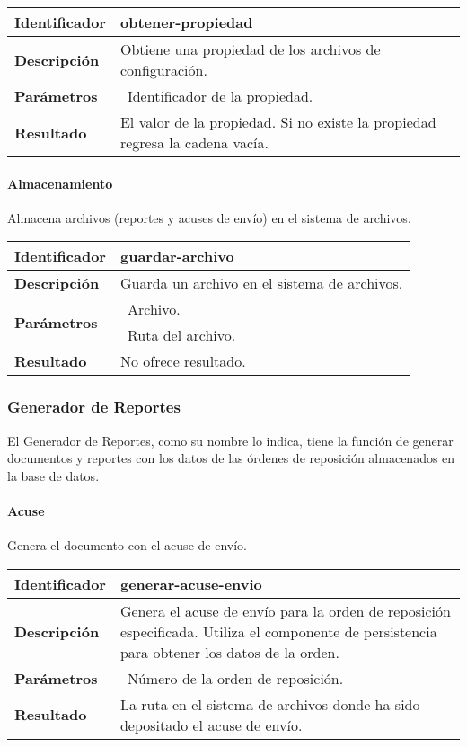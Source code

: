 	\begin{longtable}{|p{}|p{}|}
		\hline
		\textbf{Identificador}	& \textbf{obtener-propiedad}\\
		\hline
		\hline
		\textbf{Descripción}	& Obtiene una propiedad de los archivos de configuración.\\
		\hline
		\textbf{Parámetros}		& \textbullet\, Identificador de la propiedad.\\
		\hline
		\textbf{Resultado}		& El valor de la propiedad. Si no existe la propiedad regresa la cadena vacía.\\
		\hline
	\end{longtable}

\paragraph{Almacenamiento\\}
Almacena archivos (reportes y acuses de envío) en el sistema de archivos.

	\begin{longtable}{|p{}|p{}|}
		\hline
		\textbf{Identificador}	& \textbf{guardar-archivo}\\
		\hline
		\hline
		\textbf{Descripción}	& Guarda un archivo en el sistema de archivos.\\
		\hline
		\multirow{2}{*}{\textbf{Parámetros}}	& \textbullet\, Archivo.\\
												& \textbullet\, Ruta del archivo.\\
		\hline
		\textbf{Resultado}		& No ofrece resultado.\\
		\hline
	\end{longtable}

\subsubsection{Generador de Reportes}
El Generador de Reportes, como su nombre lo indica, tiene la función de generar documentos y reportes con los datos de las órdenes de reposición almacenados en la base de datos. 
\paragraph{Acuse\\} Genera el documento con el acuse de envío.

	\begin{longtable}{|p{}|p{}|}
		\hline
		\textbf{Identificador}	& \textbf{generar-acuse-envio}\\
		\hline
		\hline
		\textbf{Descripción}	& Genera el acuse de envío para la orden de reposición especificada. Utiliza el componente de persistencia para obtener los datos de la orden.\\
		\hline
		\textbf{Parámetros}		& \textbullet\, Número de la orden de reposición.\\
		\hline
		\textbf{Resultado}		& La ruta en el sistema de archivos donde ha sido depositado el acuse de envío.\\
		\hline
	\end{longtable}

